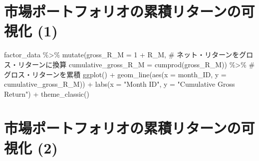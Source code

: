 \documentclass[
  letterpaper,
  DIV=11,
  numbers=noendperiod]{scrreprt}
\newenvironment{Shaded}{\begin{snugshade}}{\end{snugshade}}
\newcommand{\AttributeTok}[1]{\textcolor[rgb]{0.40,0.45,0.13}{#1}}
\newcommand{\CommentTok}[1]{\textcolor[rgb]{0.37,0.37,0.37}{#1}}
\newcommand{\DecValTok}[1]{\textcolor[rgb]{0.68,0.00,0.00}{#1}}
\newcommand{\FunctionTok}[1]{\textcolor[rgb]{0.28,0.35,0.67}{#1}}
\newcommand{\NormalTok}[1]{\textcolor[rgb]{0.00,0.23,0.31}{#1}}
\newcommand{\SpecialCharTok}[1]{\textcolor[rgb]{0.37,0.37,0.37}{#1}}
\newcommand{\StringTok}[1]{\textcolor[rgb]{0.13,0.47,0.30}{#1}}
\begin{document}
\section{市場ポートフォリオの累積リターンの可視化
(1)}\label{ux5e02ux5834ux30ddux30fcux30c8ux30d5ux30a9ux30eaux30aaux306eux7d2fux7a4dux30eaux30bfux30fcux30f3ux306eux53efux8996ux5316-1}

\begin{Shaded}
\begin{Highlighting}[]
\NormalTok{factor\_data }\SpecialCharTok{\%\textgreater{}\%} 
  \FunctionTok{mutate}\NormalTok{(}\AttributeTok{gross\_R\_M =} \DecValTok{1} \SpecialCharTok{+}\NormalTok{ R\_M, }\CommentTok{\# ネット・リターンをグロス・リターンに換算}
         \AttributeTok{cumulative\_gross\_R\_M =} \FunctionTok{cumprod}\NormalTok{(gross\_R\_M)) }\SpecialCharTok{\%\textgreater{}\%} \CommentTok{\# グロス・リターンを累積}
  \FunctionTok{ggplot}\NormalTok{() }\SpecialCharTok{+}
  \FunctionTok{geom\_line}\NormalTok{(}\FunctionTok{aes}\NormalTok{(}\AttributeTok{x =}\NormalTok{ month\_ID, }\AttributeTok{y =}\NormalTok{ cumulative\_gross\_R\_M)) }\SpecialCharTok{+} 
  \FunctionTok{labs}\NormalTok{(}\AttributeTok{x =} \StringTok{"Month ID"}\NormalTok{, }\AttributeTok{y =} \StringTok{"Cumulative Gross Return"}\NormalTok{) }\SpecialCharTok{+} 
  \FunctionTok{theme\_classic}\NormalTok{()}
\end{Highlighting}
\end{Shaded}

\section{市場ポートフォリオの累積リターンの可視化
(2)}\label{ux5e02ux5834ux30ddux30fcux30c8ux30d5ux30a9ux30eaux30aaux306eux7d2fux7a4dux30eaux30bfux30fcux30f3ux306eux53efux8996ux5316-2}
\end{document}
